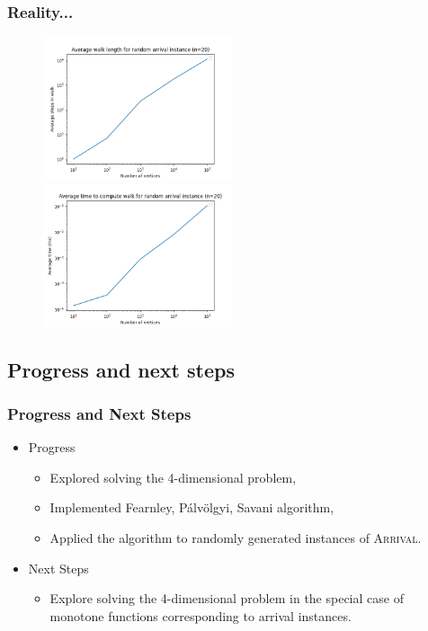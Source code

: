 \documentclass{beamer}
\begin{document}
\begin{frame}
\frametitle{Reality...}
    \begin{figure}[t]
        \centering
        \includegraphics[width=2.2in]{walkLength.png}
        \centering
        \includegraphics[width=2.2in]{walkTime.png}
    \end{figure}
    
\end{frame}

\subsection{Progress and next steps}
\newcommand{\pav}{Pálvölgyi}
\begin{frame}
\frametitle{Progress and Next Steps}
    \begin{itemize}
        \item Progress
        \begin{itemize}
            \item Explored solving the 4-dimensional \trsk problem,
            \item Implemented Fearnley, \pav, Savani algorithm,
            \item Applied the algorithm to randomly generated instances of \textsc{Arrival}.
        \end{itemize}
        \item Next Steps
        \begin{itemize}
            \item Explore solving the 4-dimensional \trsk problem in the special case of monotone functions
            corresponding to arrival instances.
        \end{itemize}
    \end{itemize}
\end{frame}
\end{document}
